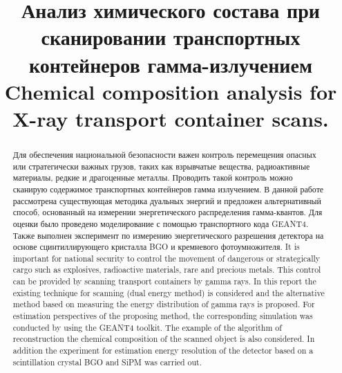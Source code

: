 \documentclass[a4paper]{panl}
\begin{document}
\title{Анализ химического состава при сканировании транспортных контейнеров гамма-излучением \\ Chemical composition analysis for X-ray transport container scans.}
\maketitle

\vspace{-3mm}
\begin{abstract}
Для обеспечения национальной безопасности важен контроль перемещения опасных или стратегически важных грузов, таких как взрывчатые вещества, радиоактивные материалы, редкие и драгоценные металлы. Проводить такой контроль можно сканирую содержимое   транспортных контейнеров гамма излучением. В данной работе рассмотрена существующая методика дуальных энергий и предложен альтернативный способ, основанный на измерении энергетического распределения гамма-квантов. Для оценки было проведено моделирование с помощью транспортного кода GEANT4.  Также выполнен эксперимент по измерению энергетического разрешения детектора на основе сцинтиллирующего кристалла BGO и кремневого фотоумножителя. 
\vspace{0.2cm}
It is important for national security to control the movement of dangerous or strategically cargo such as explosives, radioactive materials, rare and precious metals. This control can be provided by scanning transport containers by gamma rays.
In this report the existing technique for scanning (dual energy method) is considered and the alternative method based on measuring the energy distribution of gamma rays is proposed. For estimation perspectives of the proposing method, the  corresponding simulation was conducted by using the GEANT4 toolkit. The example of the algorithm of reconstruction the chemical composition of the scanned object is also considered. In addition the experiment for estimation energy resolution of the detector based on a scintillation crystal BGO and SiPM was carried out.\\
\end{abstract}
\vspace*{6pt}
\end{document}
